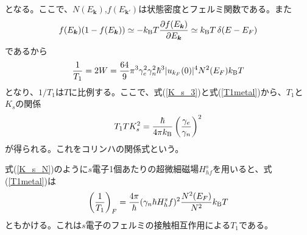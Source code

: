 \documentclass[11pt,a4j]{jreport}
\begin{document}
となる。ここで、$N(E_{\bm{k}})$,$f(E_{\bm{k'}})$は状態密度とフェルミ関数である。また
\begin{equation}
  f(E_{\bm k})(1 - f(E_{\bm k})) \simeq -k_{\text B} T \frac{\partial f(E_{\bm k})}{\partial E_{\bm k}}\simeq k_{\text B} T \, \delta(E - E_F)
\end{equation}
であるから
\begin{equation}
  \frac{1}{T_1}=2W=\frac{64}{9}\pi^3\gamma^2_e\gamma^2_n\hbar^3|u_{k_F}(0)|^4N^2(E_F)k_{\text B}T
  \label{T1metal}
\end{equation}
となり、$1/T_1$は$T$に比例する。ここで、式(\ref{K_s_3})と式(\ref{T1metal})から、$T_1$と$K_s$の関係
\begin{equation}
  T_1TK^2_s=\frac{\hbar}{4\pi k_{\text B}}\left(\frac{\gamma_e}{\gamma_n}\right)^2
\end{equation}
が得られる。これをコリンハの関係式という。\par
式(\ref{K_s_N})のように$s$電子1個あたりの超微細磁場$H^s_{hf}$を用いると、式(\ref{T1metal})は
\begin{equation}
  \left(\frac{1}{T_1}\right)_F = \frac{4\pi}{\hbar}(\gamma_n\hbar H^s_hf)^2\frac{N^2(E_F)}{N^2}k_{\text B}T
\end{equation}
ともかける。これは$s$電子のフェルミの接触相互作用による$T_1$である。
\end{document}

